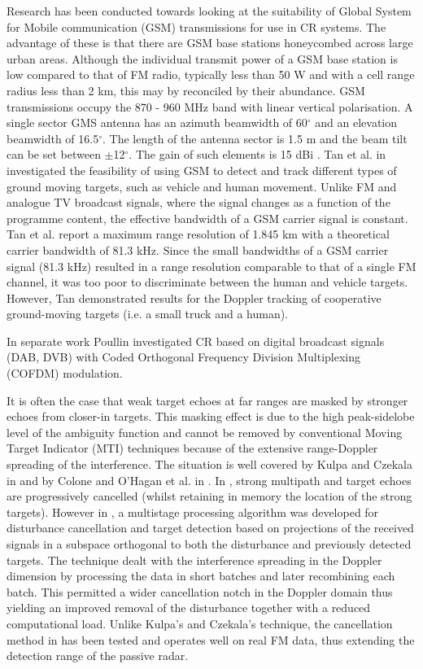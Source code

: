 Research has been conducted towards looking at the suitability of Global System for Mobile communication (GSM) transmissions for use in CR systems.  The advantage of these is that there are GSM base stations honeycombed across large urban areas.  Although the individual transmit power of a GSM base station is low compared to that of FM radio, typically less than 50 W and with a cell range radius less than 2 km, this may by reconciled by their abundance.  GSM transmissions occupy the 870 - 960 MHz band with linear vertical polarisation.  A single sector GMS antenna has an azimuth beamwidth of 60$^\circ$ and an elevation beamwidth of 16.5$^\circ$.  The length of the antenna sector is 1.5 m and the beam tilt can be set between $\pm$12$^\circ$.  The gain of such elements is 15 dBi \cite{kitchen}.  Tan et al. in \cite{tan} investigated the feasibility of using GSM to detect and track different types of ground moving targets, such as vehicle and human movement.  Unlike FM and analogue TV broadcast signals, where the signal changes as a function of the programme content, the effective bandwidth of a GSM carrier signal is constant.  Tan et al. report a maximum range resolution of 1.845 km with a theoretical carrier bandwidth of 81.3 kHz.  Since the small bandwidths of a GSM carrier signal (81.3 kHz) resulted in a range resolution comparable to that of a single FM channel, it was too poor to discriminate between the human and vehicle targets. However, Tan demonstrated results for the Doppler tracking of cooperative ground-moving targets (i.e. a small truck and a human).

In separate work Poullin \cite{poullin} investigated CR based on digital broadcast signals (DAB, DVB) with Coded Orthogonal Frequency Division Multiplexing (COFDM) modulation.  

It is often the case that weak target echoes at far ranges are masked by stronger echoes from closer-in targets.  This masking effect is due to the high peak-sidelobe level of the ambiguity function and cannot be removed by conventional Moving Target Indicator (MTI) techniques because of the extensive range-Doppler spreading of the interference.  The situation is well covered by Kulpa and Czekala in \cite{kulpa1} and by Colone and O'Hagan et al. in \cite{ohagan5}.  In \cite{kulpa1}, strong multipath and target echoes are progressively cancelled (whilst retaining in memory the location of the strong targets).  However in \cite{ohagan5}, a multistage processing algorithm was developed for disturbance cancellation and target detection based on projections of the received signals in a subspace orthogonal to both the disturbance and previously detected targets.  The technique dealt with the interference spreading in the Doppler dimension by processing the data in short batches and later recombining each batch. This permitted a wider cancellation notch in the Doppler domain thus yielding an improved removal of the disturbance together with a reduced computational load.  Unlike Kulpa's and Czekala's technique, the cancellation method in \cite{ohagan5} has been tested and operates well on real FM data, thus extending the detection range of the passive radar.

